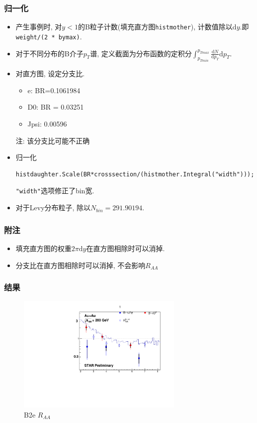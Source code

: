 \documentclass{beamer}
\newcommand{\rd}{\mathrm{d}}
\newcommand{\eddon}[2]{\frac{\mathrm{d}{#1}}{\mathrm{d}{#2}}}
\begin{document}
\begin{frame}
\frametitle{归一化}
	\begin{itemize}
		\item 产生事例时, 对{\kaishu $y<1$的B粒子计数(填充直方图\texttt{histmother}), 计数值除以$\rd y$.}即\texttt{weight/(2 * bymax)}.
		\item 对于不同分布的B介子$p_T$谱, 定义{\kaishu 截面}为分布函数的定积分$\int_{p_{Tmin}}^{p_{Tmax}}\eddon{N}{p_T}\rd p_T$.
		\item 对直方图, 设定分支比.
		\begin{itemize}
			\item e: BR=0.1061984
			\item D0: BR = 0.03251
			\item Jpsi: 0.00596
		\end{itemize}
		{\color{blue} 注: 该分支比可能不正确}
		\item 归一化
\begin{lstlisting}[style=Cstyle, frame=single]
histdaughter.Scale(BR*crosssection/(histmother.Integral("width")));
\end{lstlisting}
\texttt{"width"}选项修正了bin宽.	
\item 对于Levy分布粒子, 除以$N_{bin}=291.90194$.		
	\end{itemize}
\end{frame}
\begin{frame}
\frametitle{附注}
	\begin{itemize}
		\item 填充直方图的权重$2\pi \rd y$在直方图相除时可以消掉.
		\item 分支比在直方图相除时可以消掉, 不会影响$R_{AA}$
	\end{itemize}
\end{frame}
\begin{frame}
\frametitle{结果}
\begin{figure}[h]
	\includegraphics[width=8cm]{src/B2e.pdf}
	\caption{B2e $R_{AA}$}
\end{figure}
\end{frame}
\end{document}
